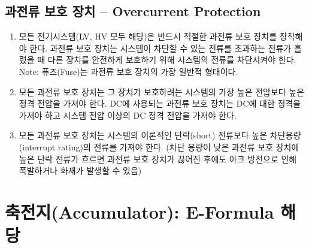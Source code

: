 \documentclass[final,a4paper,10pt]{report}
\begin{document}
\section{과전류 보호 장치 – Overcurrent Protection}
\begin{enumerate}
  \item 모든 전기시스템(LV, HV 모두 해당)은 반드시 적절한 과전류 보호 장치를 장착해야 한다. 과전류 보호 장치는 시스템이 차단할 수 있는 전류를 초과하는 전류가 흘렀을 때 다른 장치를 안전하게 보호하기 위해 시스템의 전류를 차단시켜야 한다.\\
    Note: 퓨즈(Fuse)는 과전류 보호 장치의 가장 일반적 형태이다.
  \item 모든 과전류 보호 장치는 그 장치가 보호하려는 시스템의 가장 높은 전압보다 높은 정격 전압을 가져야 한다. DC에 사용되는 과전류 보호 장치는 DC에 대한 정격을 가져야 하고 시스템 전압 이상의 DC 정격 전압을 가져야 한다.
  \item 모든 과전류 보호 장치는 시스템의 이론적인 단락(short) 전류보다 높은 차단용량(interrupt rating)의 전류를 가져야 한다. (차단 용량이 낮은 과전류 보호 장치에 높은 단락 전류가 흐르면 과전류 보호 장치가 끊어진 후에도 아크 방전으로 인해 폭발하거나 화재가 발생할 수 있음)
\end{enumerate}

\chapter{축전지(Accumulator): E-Formula 해당}
\end{document}
